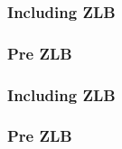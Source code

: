 \subsubsection{Including ZLB}\subsubsection{Pre ZLB}\subsubsection{Including ZLB}\subsubsection{Pre ZLB}